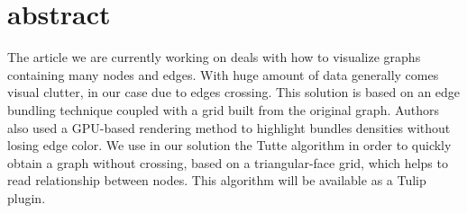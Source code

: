 \section*{abstract}

The article we are currently working on deals with how to visualize graphs containing many nodes and edges. With huge amount of data generally comes visual clutter, in our case due to edges crossing. This solution is based on an edge bundling technique coupled with a grid built from the original graph. Authors also used a GPU-based rendering method to highlight bundles densities without losing edge color. We use in our solution the Tutte algorithm in order to quickly obtain a graph without crossing, based on a triangular-face grid, which helps to read relationship between nodes. This algorithm will be available as a Tulip plugin. 
